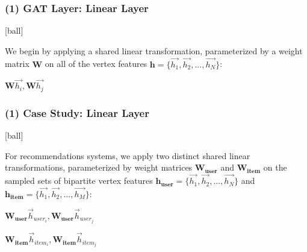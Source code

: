 \documentclass{beamer}
\begin{document}

\begin{frame}[fragile]
\begin{itemize}
\frametitle{(1) GAT Layer: Linear Layer}
[ball]

\item We begin by applying a shared
linear transformation, parameterized by a weight matrix $\textbf{W}$ on all of the vertex features $\textbf{h} = \{\overrightarrow{h_{1}},\overrightarrow{h_{2}},...,\overrightarrow{h_{N}} \}$:

\begin{center}
    \item[] $\textbf{W}\overrightarrow{h_{i}}, \textbf{W}\overrightarrow{h_{j}}$
\end{center}

\end{itemize}
\end{frame}


\begin{frame}[fragile]
\begin{itemize}
\frametitle{(1) Case Study: Linear Layer}
[ball]

\item For recommendations systems, we apply two distinct shared linear transformations, parameterized by weight matrices $\mathbf{W_{\text{user}}}$ and $\mathbf{W_{\text{item}}}$ on the sampled sets of bipartite vertex features $\mathbf{h_{\text{user}}} = \{\overrightarrow{h_{1}},\overrightarrow{h_{2}},...,\overrightarrow{h_{N}} \}$ and $\mathbf{h_{\text{item}}} = \{\overrightarrow{h_{1}},\overrightarrow{h_{2}},...,\overrightarrow{h_{M}} \}$:

\begin{center}
    \item[] $\mathbf{W_{\text{user}}}\overrightarrow{h}_{user_{i}}, \mathbf{W_{\text{user}}}\overrightarrow{h}_{user_{j}}$
    \vspace{0.3cm}
    \item[] $\mathbf{W_{\text{item}}}\overrightarrow{h}_{item_{i}}, \mathbf{W_{\text{item}}}\overrightarrow{h}_{item_{j}}$
    
\end{center}
\end{itemize}
\end{frame}
\end{document}
